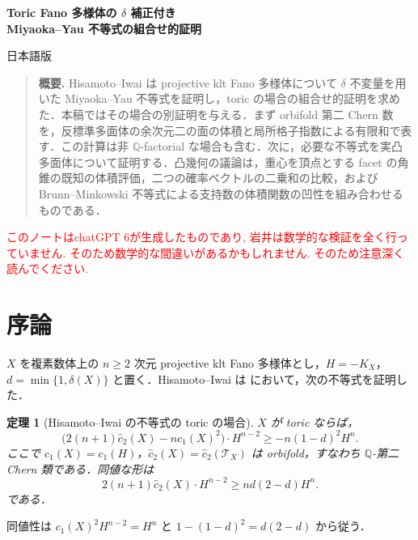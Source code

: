 \documentclass[12pt]{amsart}
\theoremstyle{definition}
\theoremstyle{remark}
\numberwithin{equation}{section}
\newcommand{\xr}[1]{\textcolor{red}{#1}}
\theoremstyle{plain}
\newtheorem{jthm}[thm]{定理}
\theoremstyle{definition}
\theoremstyle{remark}
\newcommand{\notelanguage}{en}
\begin{document}
\newpage
\renewcommand{\notelanguage}{ja}
\setcounter{section}{0}
\setcounter{thm}{0}
\setcounter{equation}{0}
\renewcommand{\proofname}{証明}
\renewcommand{\refname}{参考文献}
\begin{center}
{\large\bfseries Toric Fano 多様体の $\delta$ 補正付き\\
Miyaoka--Yau 不等式の組合せ的証明\par}
\vspace{0.8em}
日本語版
\end{center}
\begin{quote}\small
\noindent\textbf{概要.}\quad
Hisamoto--Iwai は projective klt Fano 多様体について $\delta$ 不変量を用いた Miyaoka--Yau 不等式を証明し，toric の場合の組合せ的証明を求めた．本稿ではその場合の別証明を与える．まず orbifold 第二 Chern 数を，反標準多面体の余次元二の面の体積と局所格子指数による有限和で表す．この計算は非 $\mathbb Q$-factorial な場合も含む．次に，必要な不等式を実凸多面体について証明する．凸幾何の議論は，重心を頂点とする facet の角錐の既知の体積評価，二つの確率ベクトルの二乗和の比較，および Brunn--Minkowski 不等式による支持数の体積関数の凹性を組み合わせるものである．
\end{quote}

\xr{このノートはchatGPT 6が生成したものであり, 岩井は数学的な検証を全く行っていません. そのため数学的な間違いがあるかもしれません. そのため注意深く読んでください.}
\section{序論}\label{ja:sec:intro}
$X$ を複素数体上の $n\ge2$ 次元 projective klt Fano 多様体とし，$H=-K_X$，$d=\min\{1,\delta(X)\}$ と置く．Hisamoto--Iwai は \cite[Theorem~1.1, equivalently Theorem~7.2]{ja:HI} において，次の不等式を証明した．

\begin{jthm}[Hisamoto--Iwai の不等式の toric の場合]\label{ja:thm:main}
$X$ が toric ならば，
\begin{equation}\label{ja:eq:main}
 \bigl(2(n+1)\widehat c_2(X)-nc_1(X)^2\bigr)\cdot H^{n-2}
 \ge -n(1-d)^2H^n.
\end{equation}
ここで $c_1(X)=c_1(H)$，$\widehat c_2(X)=\widehat c_2(\mathcal T_X)$ は orbifold，すなわち $\mathbb Q$-第二 Chern 類である．同値な形は
\begin{equation}\label{ja:eq:main-equivalent}
 2(n+1)\widehat c_2(X)\cdot H^{n-2}\ge nd(2-d)H^n.
\end{equation}
である．
\end{jthm}
同値性は $c_1(X)^2H^{n-2}=H^n$ と $1-(1-d)^2=d(2-d)$ から従う．
\end{document}
